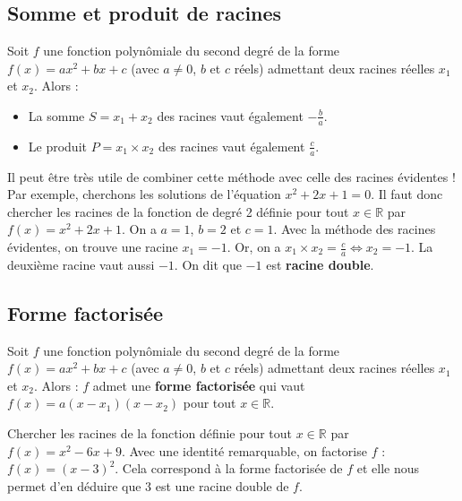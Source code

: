 	\subsection{Somme et produit de racines}

	\begin{formula}[Relations]
		Soit $f$ une fonction polynômiale du second degré de la forme $f(x) = ax^2 + bx +c$ (avec $a \neq 0$, $b$ et $c$ réels) admettant deux racines réelles $x_1$ et $x_2$. Alors :
		\begin{itemize}
			\item La somme $S = x_1 + x_2$ des racines vaut également $\displaystyle{-\frac{b}{a}}$.
			\item Le produit $P = x_1 \times x_2$ des racines vaut également $\displaystyle{\frac{c}{a}}$.
		\end{itemize}
	\end{formula}

	\begin{tip}[Exemple]
		Il peut être très utile de combiner cette méthode avec celle des racines évidentes !
		Par exemple, cherchons les solutions de l'équation $x^2 + 2x + 1 = 0$.
		\newpar
		Il faut donc chercher les racines de la fonction de degré 2 définie pour tout $x \in \mathbb{R}$ par $f(x) = x^2 + 2x + 1$.
		\newpar
		On a $a = 1$, $b = 2$ et $c = 1$. Avec la méthode des racines évidentes, on trouve une racine $x_1 = -1$.
		\newpar
		Or, on a $\displaystyle{x_1 \times x_2 = \frac{c}{a} \iff x_2 = -1}$. La deuxième racine vaut aussi $-1$.
		\newpar
		On dit que $-1$ est \textbf{racine double}.
	\end{tip}

	\subsection{Forme factorisée}

	\begin{formula}[Définition]
		Soit $f$ une fonction polynômiale du second degré de la forme $f(x) = ax^2 + bx +c$ (avec $a \neq 0$, $b$ et $c$ réels) admettant deux racines réelles $x_1$ et $x_2$. Alors :
		\newpar
		$f$ admet une \textbf{forme factorisée} qui vaut $f(x) = a(x-x_1)(x-x_2)$ pour tout $x \in \mathbb{R}$.
	\end{formula}

	\begin{tip}[Exemple]
		Chercher les racines de la fonction définie pour tout $x \in \mathbb{R}$ par $f(x) = x^2 - 6x + 9$.
		\newpar
		Avec une identité remarquable, on factorise $f$ : $f(x) = (x - 3)^2$.
		\newpar
		Cela correspond à la forme factorisée de $f$ et elle nous permet d'en déduire que $3$ est une racine double de $f$.
	\end{tip}

